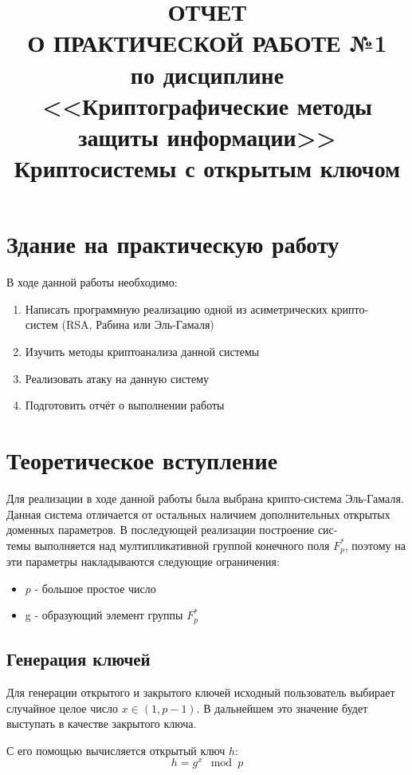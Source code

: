 \documentclass[a4paper]{article}
\title{
  ОТЧЕТ \\
  О ПРАКТИЧЕСКОЙ РАБОТЕ №1 \\
  по дисциплине <<Криптографические методы защиты информации>> \\
  Криптосистемы с открытым ключом
}
\begin{document}
  \templatedtitlepage
  
  \toc

  \section{Здание на практическую работу}
  В ходе данной работы необходимо:
  \begin{enumerate}
    \item Написать программную реализацию одной из асиметрических крипто-\\систем (RSA, Рабина или Эль-Гамаля)
    \item Изучить методы криптоанализа данной системы
    \item Реализовать атаку на данную систему
    \item Подготовить отчёт о выполнении работы 
  \end{enumerate}

  \newpage
  \section{Теоретическое вступление}

  Для реализации в ходе данной работы была выбрана крипто-система Эль-Гамаля.
  Данная система отличается от остальных наличием дополнительных открытых доменных параметров.
  В последующей реализации построение сис-\\темы выполняется над мултипликативной группой конечного поля $F_p^*$,
  поэтому на эти параметры накладываются следующие ограничения:

  \begin{itemize}
    \item $p$ - большое простое число
    \item g - образующий элемент группы $F_p^*$
  \end{itemize}

  \subsection{Генерация ключей}

  Для генерации открытого и закрытого ключей исходный пользователь выбирает случайное
  целое число $x \in \left(1, p - 1\right)$. В дальнейшем это значение будет выступать
  в качестве закрытого ключа.

  С его помощью вычисляется открытый ключ $h$:
  \begin{equation}
    h = g^x\mod{p}
  \end{equation}
\end{document}
